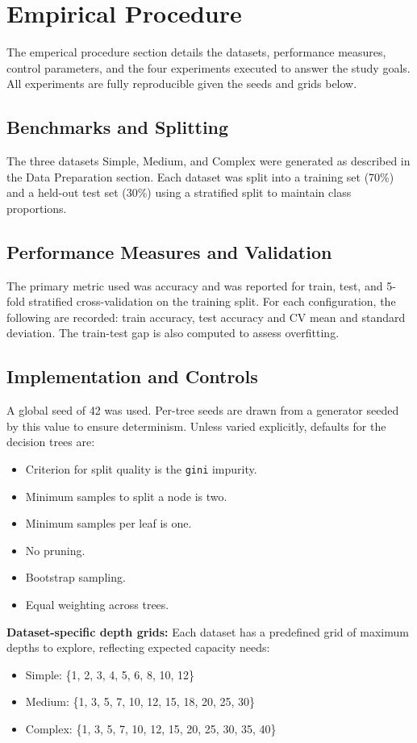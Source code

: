 \documentclass[conference]{IEEEtran}
\begin{document}
\section{Empirical Procedure}

The emperical procedure section details the datasets, performance measures, control parameters, and the four experiments executed to answer the study goals. All experiments are fully 
reproducible given the seeds and grids below.

\subsection{Benchmarks and Splitting}
The three datasets Simple, Medium, and Complex were generated as described in the Data Preparation section. Each dataset was split into a training set (70\%) and a held-out test set (30\%) using a stratified split to maintain class proportions.

\subsection{Performance Measures and Validation}
The primary metric used was accuracy and was reported for train, test, and 5-fold stratified cross-validation on the training split. For each configuration, the following are 
recorded: train accuracy, test accuracy and CV mean and standard deviation.  The train-test gap is also computed to assess overfitting.  

\subsection{Implementation and Controls}
A global seed of 42 was used. Per-tree seeds are drawn from a generator seeded by this value to ensure determinism. Unless varied explicitly, defaults for the 
decision trees are:
\begin{itemize}
  \item Criterion for split quality is the \texttt{gini} impurity.
  \item Minimum samples to split a node is two.
  \item Minimum samples per leaf is one.
  \item No pruning.
  \item Bootstrap sampling.
  \item Equal weighting across trees.
\end{itemize}

\textbf{Dataset-specific depth grids:} Each dataset has a predefined grid of maximum depths to explore, reflecting expected capacity needs:
\begin{itemize}
  \item Simple: \{1, 2, 3, 4, 5, 6, 8, 10, 12\}
  \item Medium: \{1, 3, 5, 7, 10, 12, 15, 18, 20, 25, 30\}
  \item Complex: \{1, 3, 5, 7, 10, 12, 15, 20, 25, 30, 35, 40\}
\end{itemize}
\end{document}
